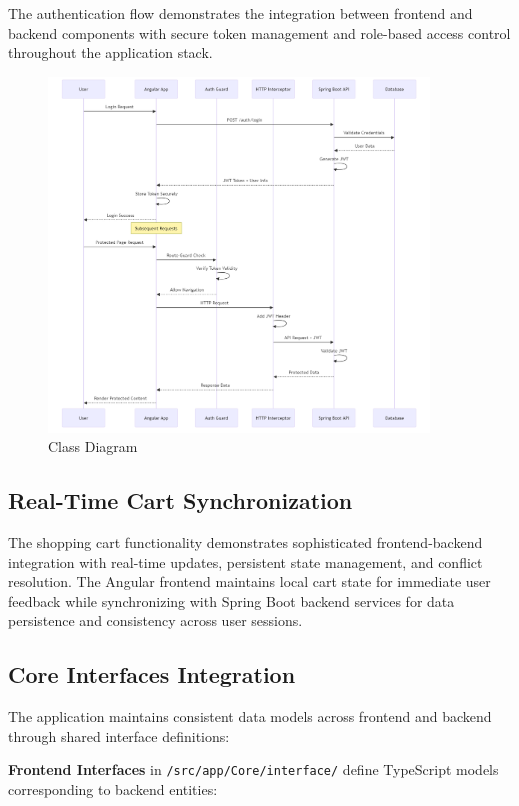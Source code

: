 \documentclass[12pt,a4paper]{article}
\begin{document}
The authentication flow demonstrates the integration between frontend and backend components with secure token management and role-based access control throughout the application stack.

\begin{figure}[H]
    \centering
    \includegraphics[width=0.9\textwidth]{authseq.png}
    \caption{Class Diagram}
\end{figure}


\subsection{Real-Time Cart Synchronization}

The shopping cart functionality demonstrates sophisticated frontend-backend integration with real-time updates, persistent state management, and conflict resolution. The Angular frontend maintains local cart state for immediate user feedback while synchronizing with Spring Boot backend services for data persistence and consistency across user sessions.

\subsection{Core Interfaces Integration}

The application maintains consistent data models across frontend and backend through shared interface definitions:

\textbf{Frontend Interfaces} in \texttt{/src/app/Core/interface/} define TypeScript models corresponding to backend entities:
\end{document}

